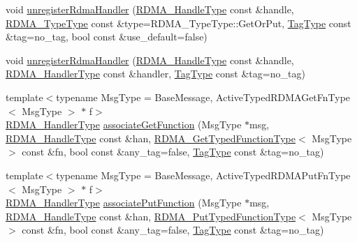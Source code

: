 \begin{DoxyCompactItemize}
void \hyperlink{structvt_1_1rdma_1_1_r_d_m_a_manager_a59de11a7b7a8034a2e8e27a10897ce01}{unregister\+Rdma\+Handler} (\hyperlink{namespacevt_a10442579ec4e7ebef223818e64bcf908}{R\+D\+M\+A\+\_\+\+Handle\+Type} const \&handle, \hyperlink{namespacevt_1_1rdma_ac848e1d9da43db6294bd06f83e5d3946}{R\+D\+M\+A\+\_\+\+Type\+Type} const \&type=R\+D\+M\+A\+\_\+\+Type\+Type\+::\+Get\+Or\+Put, \hyperlink{namespacevt_a84ab281dae04a52a4b243d6bf62d0e52}{Tag\+Type} const \&tag=no\+\_\+tag, bool const \&use\+\_\+default=false)
\item 
void \hyperlink{structvt_1_1rdma_1_1_r_d_m_a_manager_a34e50e7536bddd880c97b60b276b63ad}{unregister\+Rdma\+Handler} (\hyperlink{namespacevt_a10442579ec4e7ebef223818e64bcf908}{R\+D\+M\+A\+\_\+\+Handle\+Type} const \&handle, \hyperlink{namespacevt_a9530efb893c0f3846e8ac5f0507e0f49}{R\+D\+M\+A\+\_\+\+Handler\+Type} const \&handler, \hyperlink{namespacevt_a84ab281dae04a52a4b243d6bf62d0e52}{Tag\+Type} const \&tag=no\+\_\+tag)
\item 
{\footnotesize template$<$typename Msg\+Type  = Base\+Message, Active\+Typed\+R\+D\+M\+A\+Get\+Fn\+Type$<$ Msg\+Type $>$ $\ast$ f$>$ }\\\hyperlink{namespacevt_a9530efb893c0f3846e8ac5f0507e0f49}{R\+D\+M\+A\+\_\+\+Handler\+Type} \hyperlink{structvt_1_1rdma_1_1_r_d_m_a_manager_abcddc1a18794163032758fcf035ff406}{associate\+Get\+Function} (Msg\+Type $\ast$msg, \hyperlink{namespacevt_a10442579ec4e7ebef223818e64bcf908}{R\+D\+M\+A\+\_\+\+Handle\+Type} const \&han, \hyperlink{structvt_1_1rdma_1_1_r_d_m_a_manager_a0d865535d118fe9dcab074fd3df74ce1}{R\+D\+M\+A\+\_\+\+Get\+Typed\+Function\+Type}$<$ Msg\+Type $>$ const \&fn, bool const \&any\+\_\+tag=false, \hyperlink{namespacevt_a84ab281dae04a52a4b243d6bf62d0e52}{Tag\+Type} const \&tag=no\+\_\+tag)
\item 
{\footnotesize template$<$typename Msg\+Type  = Base\+Message, Active\+Typed\+R\+D\+M\+A\+Put\+Fn\+Type$<$ Msg\+Type $>$ $\ast$ f$>$ }\\\hyperlink{namespacevt_a9530efb893c0f3846e8ac5f0507e0f49}{R\+D\+M\+A\+\_\+\+Handler\+Type} \hyperlink{structvt_1_1rdma_1_1_r_d_m_a_manager_a5092afb73c1a6fb69cb211f23eb704cb}{associate\+Put\+Function} (Msg\+Type $\ast$msg, \hyperlink{namespacevt_a10442579ec4e7ebef223818e64bcf908}{R\+D\+M\+A\+\_\+\+Handle\+Type} const \&han, \hyperlink{structvt_1_1rdma_1_1_r_d_m_a_manager_ad9746ec3367968e16945ef88c1ac45ce}{R\+D\+M\+A\+\_\+\+Put\+Typed\+Function\+Type}$<$ Msg\+Type $>$ const \&fn, bool const \&any\+\_\+tag=false, \hyperlink{namespacevt_a84ab281dae04a52a4b243d6bf62d0e52}{Tag\+Type} const \&tag=no\+\_\+tag)

\end{DoxyCompactItemize}
